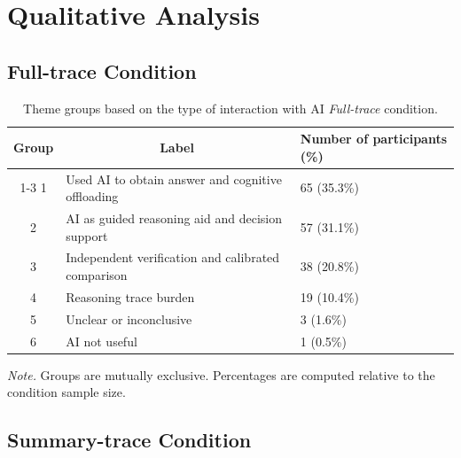 \documentclass[manuscript, anonymous=false,authorversion,review=false]{acmart}
\begin{document}
\section{Qualitative Analysis}

\subsection{Full-trace Condition}
\begin{table}[H]
\centering
\caption{Theme groups based on the type of interaction with AI \textit{Full-trace} condition.}
\begin{tabular}{cll}
\hline
Group & \multicolumn{1}{c}{Label}                                            & Number of participants (\%)        \\ \cline{1-3}
1     & Used AI to obtain answer and cognitive offloading  & 65 (35.3\%)     \\
2     & AI as guided reasoning aid and decision support    & 57 (31.1\%)   \\
3     & Independent verification and calibrated comparison & 38 (20.8\%)   \\
4     & Reasoning trace burden                           & 19 (10.4\%)     \\
5     & Unclear or inconclusive                           & 3 (1.6\%)     \\
6     & AI not useful                                    & 1 (0.5\%)    \\
\hline
\end{tabular}

\label{tab:qualitative_C2}

\raggedright \small \textit{Note.} Groups are mutually exclusive. Percentages are computed relative to the condition sample size.
\end{table}

\subsection{Summary-trace Condition}
\end{document}
